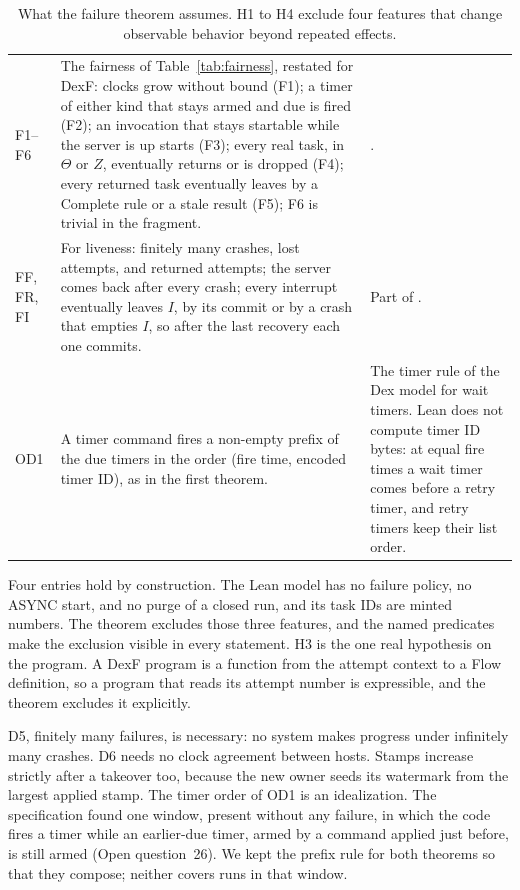 \begin{table}[t]
\begin{tabularx}{\textwidth}{@{}P{1.2cm}LP{4.6cm}@{}}
F1--F6 & The fairness of Table~\ref{tab:fairness}, restated for DexF:
  clocks grow without bound (F1); a timer of either kind that stays armed
  and due is fired (F2); an invocation that stays startable while the
  server is up starts (F3); every real task, in $\Theta$ or $Z$,
  eventually returns or is dropped (F4); every returned task eventually
  leaves by a Complete rule or a stale result (F5); F6 is trivial in the
  fragment. & . \\
FF, FR, FI & For liveness: finitely many crashes, lost attempts, and
  returned attempts; the server comes back after every crash; every
  interrupt eventually leaves $I$, by its commit or by a crash that
  empties $I$, so after the last recovery each one commits. & Part of
  . \\
OD1 & A timer command fires a non-empty prefix of the due timers in the
  order (fire time, encoded timer ID), as in the first theorem. & The
  timer rule of the Dex model for wait timers. Lean does not compute
  timer ID bytes: at equal fire times a wait timer comes before a retry
  timer, and retry timers keep their list order. \\
\bottomrule
\end{tabularx}
\caption{What the failure theorem assumes. H1 to H4 exclude four features
that change observable behavior beyond repeated effects.}
\label{tab:failure-hypotheses}
\end{table}

Four entries hold by construction. The Lean model has no failure policy,
no ASYNC start, and no purge of a closed run, and its task IDs are minted
numbers. The
theorem excludes those three features, and the named predicates make the
exclusion visible in every statement. H3 is the one real hypothesis on the
program. A DexF program is a function from the
attempt context to a Flow definition, so a program that reads its attempt
number is expressible, and the theorem excludes it explicitly.

D5, finitely many failures, is necessary: no system makes progress under
infinitely many crashes. D6 needs no clock
agreement between hosts. Stamps increase strictly after a takeover too,
because the new owner seeds its watermark from the largest applied stamp.
The timer order of OD1 is an idealization. The specification found one
window, present without any failure, in which the code fires a timer while
an earlier-due timer, armed by a command applied just before, is still
armed (Open question~26). We kept the prefix rule for both theorems so
that they compose; neither covers runs in that window.

